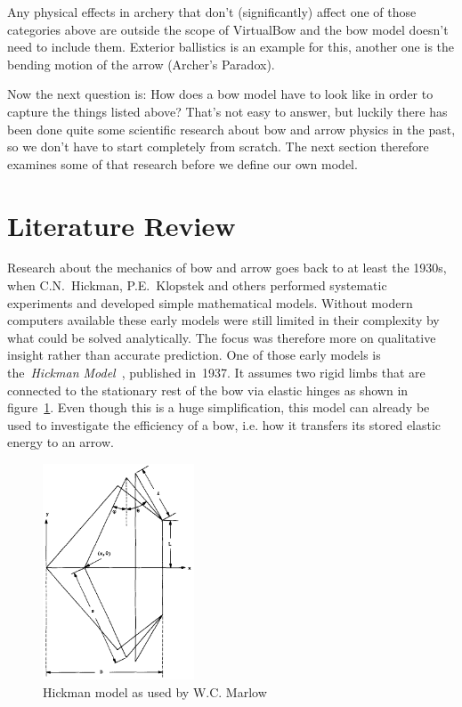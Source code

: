 Any physical effects in archery that don't (significantly) affect one of those categories above are outside the scope of VirtualBow and the bow model doesn't need to include them.
Exterior ballistics is an example for this, another one is the bending motion of the arrow (Archer's Paradox).

Now the next question is: How does a bow model have to look like in order to capture the things listed above?
That's not easy to answer, but luckily there has been done quite some scientific research about bow and arrow physics in the past, so we don't have to start completely from scratch.
The next section therefore examines some of that research before we define our own model.

\section{Literature Review}

Research about the mechanics of bow and arrow goes back to at least the 1930s, when C.N.~Hickman, P.E.~Klopstek and others performed systematic experiments and developed simple mathematical models.
Without modern computers available these early models were still limited in their complexity by what could be solved analytically.
The focus was therefore more on qualitative insight rather than accurate prediction.
One of those early models is the~\textit{Hickman Model}~\cite{bib:hi37}, published in~1937.
It assumes two rigid limbs that are connected to the stationary rest of the bow via elastic hinges as shown in figure~\ref{fig:model:hickman}.
Even though this is a huge simplification, this model can already be used to investigate the efficiency of a bow, i.e. how it transfers its stored elastic energy to an arrow.

\begin{figure}[h]
\centering
\includegraphics[width=0.4\textwidth]{figures/model/hickman}
\caption{Hickman model as used by W.C. Marlow \cite{bib:ma80}}
\label{fig:model:hickman}
\end{figure}

